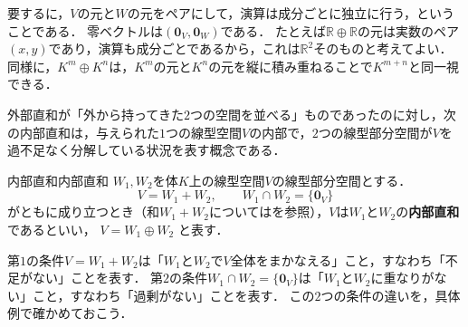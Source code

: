 要するに，$V$の元と$W$の元をペアにして，演算は成分ごとに独立に行う，ということである．
零ベクトルは$(\bm{0}_V,\bm{0}_W)$である．
たとえば$\mathbb{R}\oplus\mathbb{R}$の元は実数のペア$(x,y)$であり，演算も成分ごとであるから，これは$\mathbb{R}^2$そのものと考えてよい．
同様に，$K^m\oplus K^n$は，$K^m$の元と$K^n$の元を縦に積み重ねることで$K^{m+n}$と同一視できる．

外部直和が「外から持ってきた$2$つの空間を並べる」ものであったのに対し，次の内部直和は，与えられた$1$つの線型空間$V$の内部で，$2$つの線型部分空間が$V$を過不足なく分解している状況を表す概念である．

\begin{definition}{内部直和}{内部直和}
  $W_1, W_2$を体$K$上の線型空間$V$の線型部分空間とする．
  \[
    V = W_1 + W_2,
    \qquad
    W_1 \cap W_2 = \{\bm{0}_V\}
  \]
  がともに成り立つとき（和$W_1 + W_2$についてはを参照），$V$は$W_1$と$W_2$の\textbf{内部直和}であるといい，
  $V = W_1 \oplus W_2$
  と表す．
\end{definition}

第$1$の条件$V=W_1+W_2$は「$W_1$と$W_2$で$V$全体をまかなえる」こと，すなわち「不足がない」ことを表す．
第$2$の条件$W_1\cap W_2=\{\bm{0}_V\}$は「$W_1$と$W_2$に重なりがない」こと，すなわち「過剰がない」ことを表す．
この$2$つの条件の違いを，具体例で確かめておこう．

